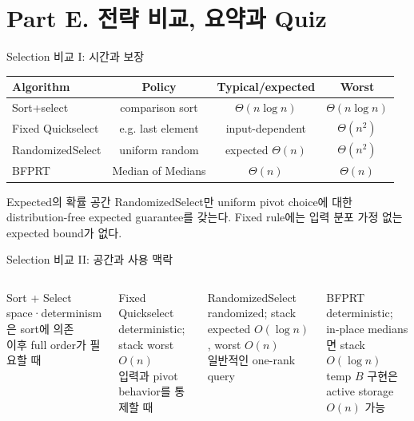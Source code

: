 \section{Part E. 전략 비교, 요약과 Quiz}
\begin{frame}{Selection 비교 I: 시간과 보장}
\centering
\small
\begin{tabular}{lccc}\toprule
Algorithm & Policy & Typical/expected & Worst\\\midrule
Sort+select & comparison sort & $\Theta(n\log n)$ & $\Theta(n\log n)$\\
Fixed Quickselect & e.g. last element & input-dependent & $\Theta(n^2)$\\
RandomizedSelect & uniform random & expected $\Theta(n)$ & $\Theta(n^2)$\\
BFPRT & Median of Medians & $\Theta(n)$ & $\Theta(n)$\\\bottomrule
\end{tabular}
\vspace{5mm}
\begin{block}{Expected의 확률 공간}
RandomizedSelect만 uniform pivot choice에 대한 distribution-free expected guarantee를 갖는다.
Fixed rule에는 입력 분포 가정 없는 expected bound가 없다.
\end{block}
\end{frame}
\begin{frame}{Selection 비교 II: 공간과 사용 맥락}
\begin{columns}[T]
\begin{block}{Sort + Select}
space·determinism은 sort에 의존\\
이후 full order가 필요할 때
\end{block}
\begin{block}{Fixed Quickselect}
deterministic; stack worst $O(n)$\\
입력과 pivot behavior를 통제할 때
\end{block}
\begin{block}{RandomizedSelect}
randomized; stack expected $O(\log n)$, worst $O(n)$\\
일반적인 one-rank query
\end{block}
\begin{block}{BFPRT}
deterministic; in-place medians면 stack $O(\log n)$\\
temp $B$ 구현은 active storage $O(n)$ 가능
\end{block}
\end{columns}
\vfill{}
\end{frame}
